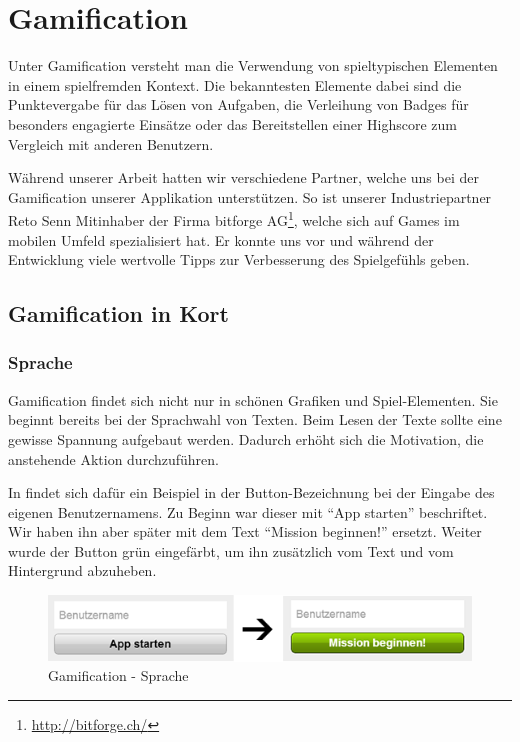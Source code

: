 \chapter{Gamification}
\label{gamification}

Unter \gls{Gamification} versteht man die Verwendung von spieltypischen Elementen in einem spielfremden Kontext.
Die bekanntesten Elemente dabei sind die Punktevergabe für das Lösen von Aufgaben, die Verleihung von Badges für besonders engagierte Einsätze oder das Bereitstellen einer Highscore zum Vergleich mit anderen Benutzern.

Während unserer Arbeit hatten wir verschiedene Partner, welche uns bei der \gls{Gamification} unserer Applikation unterstützen.
So ist unserer Industriepartner Reto Senn Mitinhaber der Firma bitforge AG\footnote{\url{http://bitforge.ch/}}, welche sich auf Games im mobilen Umfeld spezialisiert hat.
Er konnte uns vor und während der Entwicklung viele wertvolle Tipps zur Verbesserung des Spielgefühls geben.

\section{Gamification in Kort}
\subsection{Sprache}
\gls{Gamification} findet sich nicht nur in schönen Grafiken und Spiel-Elementen.
Sie beginnt bereits bei der Sprachwahl von Texten.
Beim Lesen der Texte sollte eine gewisse Spannung aufgebaut werden.
Dadurch erhöht sich die Motivation, die anstehende Aktion durchzuführen.

In \kort{} findet sich dafür ein Beispiel in der Button-Bezeichnung bei der Eingabe des eigenen Benutzernamens.
Zu Beginn war dieser mit "`App starten"' beschriftet.
Wir haben ihn aber später mit dem Text "`Mission beginnen!"' ersetzt.
Weiter wurde der Button grün eingefärbt, um ihn zusätzlich vom Text und vom Hintergrund abzuheben.

\begin{figure}[H]
	\centering
	\includegraphics{images/gamification/gamification-lang-firststeps}
	\caption{Gamification - Sprache}
	\label{gamification-lang-firststeps}
\end{figure}

